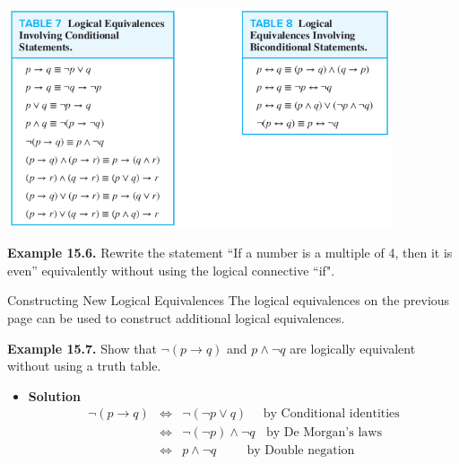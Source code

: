 \documentclass[aspectratio=169]{beamer}
\begin{document}
\begin{frame}[plain]{}
  
  \begin{center}
   \includegraphics[height=6.5cm]{./img/lecture15-fig3.png}
  \end{center}  
   
  {\bf Example 15.6.} Rewrite the statement 
    “If a number is a multiple of 4, then it is even” equivalently without using the logical
    connective ``if".
  
  
\end{frame}


\begin{frame}[plain]{Constructing New Logical Equivalences}
 The logical equivalences on the previous page can be used to construct additional logical equivalences.
\smallskip

  {\bf Example 15.7.} Show that $\neg (p\rightarrow q)$ and $p\wedge \neg q$ are logically equivalent
     without using a truth table. %
     \pause 
     
     \begin{itemize}
       \item {\bf Solution} 
          \begin{eqnarray*}
             \neg (p\rightarrow q) &\Leftrightarrow& \neg (\neg p\vee q) \ \ \ \ \ \ \mbox{by Conditional identities}\\
                &\Leftrightarrow& \neg (\neg p) \wedge \neg q \ \ \ \  \mbox{by De Morgan's laws} \\
                &\Leftrightarrow& p \wedge \neg q \ \ \ \ \ \ \ \ \ \ \ \mbox{by Double negation} 
          \end{eqnarray*}
     \end{itemize}
 
 \vspace{.5in}
 
\end{frame}
\end{document}
